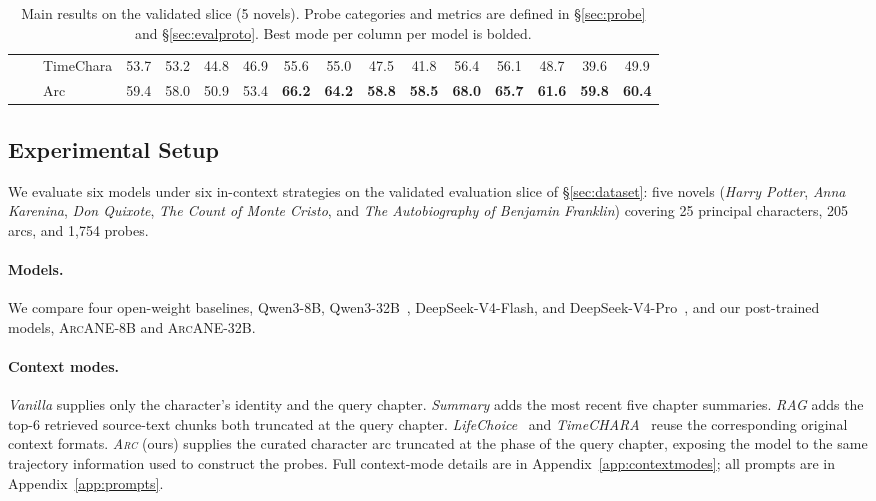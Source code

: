 \documentclass[11pt]{article}
\newcommand{\ours}{\textsc{ArcANE}}
\begin{document}
\begin{table}[!htbp]
\begin{tabular}{lllccccccccccccc}
 &  & TimeChara & 53.7 & 53.2 & 44.8 & 46.9 & 55.6 & 55.0 & 47.5 & 41.8 & 56.4 & 56.1 & 48.7 & 39.6 & 49.9 \\
 &  & \cellcolor{yellow!15} Arc & \cellcolor{yellow!15} 59.4 & \cellcolor{yellow!15} 58.0 & \cellcolor{yellow!15} 50.9 & \cellcolor{yellow!15} 53.4 & \cellcolor{yellow!15} \textbf{66.2} & \cellcolor{yellow!15} \textbf{64.2} & \cellcolor{yellow!15} \textbf{58.8} & \cellcolor{yellow!15} \textbf{58.5} & \cellcolor{yellow!15} \textbf{68.0} & \cellcolor{yellow!15} \textbf{65.7} & \cellcolor{yellow!15} \textbf{61.6} & \cellcolor{yellow!15} \textbf{59.8} & \cellcolor{yellow!15} \textbf{60.4} \\
\bottomrule
\end{tabular}
\caption{Main results on the validated slice (5 novels). Probe categories and metrics are defined in \S\ref{sec:probe} and \S\ref{sec:evalproto}. Best mode per column per model is bolded.}
\label{tab:main_results}
\end{table}



\subsection{Experimental Setup\label{sec:setup}}

We evaluate six models under six in-context strategies on the validated evaluation slice of \S\ref{sec:dataset}: five novels (\emph{Harry Potter}, \emph{Anna Karenina}, \emph{Don Quixote}, \emph{The Count of Monte Cristo}, and \emph{The Autobiography of Benjamin Franklin}) covering 25 principal characters, 205 arcs, and 1{,}754 probes.

\paragraph{Models.}
We compare four open-weight baselines, Qwen3-8B, Qwen3-32B~\cite{yang2025qwen3}, DeepSeek-V4-Flash, and DeepSeek-V4-Pro~\cite{deepseekai2026deepseekv4}, and our post-trained models, \ours{}-8B and \ours{}-32B.

\paragraph{Context modes.}
\emph{Vanilla} supplies only the character's identity and the query chapter. \emph{Summary} adds the most recent five chapter summaries. \emph{RAG} adds the top-6 retrieved source-text chunks both truncated at the query chapter. \emph{LifeChoice}~\cite{xu-etal-2025-characterisdestiny} and \emph{TimeCHARA}~\cite{ahn-etal-2024-timechara} reuse the corresponding original context formats. \emph{\textsc{Arc}} (ours) supplies the curated character arc truncated at the phase of the query chapter, exposing the model to the same trajectory information used to construct the probes. Full context-mode details are in Appendix~\ref{app:contextmodes}; all prompts are in Appendix~\ref{app:prompts}.
\end{document}
